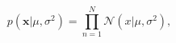 \begin{equation}
\label{eq:likelihoodgaussian}
p(\mathbf{x} | \mu, \sigma^2) = \prod_{n = 1}^{N} \mathcal{N}(x | \mu,
\sigma^2),
\end{equation}
